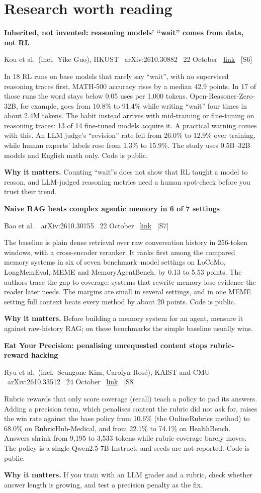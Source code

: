 \documentclass[11pt,a4paper]{article}
\newcommand{\entry}[4]{%
  \par\Needspace{7\baselineskip}\vspace{0.7em}%
  {\sffamily\bfseries\color{brandink}#1}\par
  {\footnotesize\color{brandgrey}#2 \textbullet\ \href{#3}{link} \textbullet\ \srcref{#4}}\par
  \vspace{0.15em}}
\newcommand{\why}[1]{\par{\small\textbf{Why it matters.} #1}\par}
\newcommand{\srcref}[1]{\textcolor{brandaccent}{[S#1]}}
\begin{document}
\section{Research worth reading}

\entry{Inherited, not invented: reasoning models' ``wait'' comes from data, not RL}{Kou et al.\ (incl.\ Yike Guo), HKUST \textbullet\ arXiv:2610.30882 \textbullet\ 22 October}{https://arxiv.org/abs/2610.30882}{6}
In 18 RL runs on base models that rarely say ``wait'', with no supervised reasoning traces first, MATH-500 accuracy rises by a median 42.9 points. In 17 of those runs the word stays below 0.05 uses per
1,000 tokens. Open-Reasoner-Zero-32B, for example, goes from 10.8\% to 91.4\% while writing ``wait'' four times in about 2.4M tokens. The habit instead arrives with
mid-training or fine-tuning on reasoning traces: 13 of 14 fine-tuned models acquire it. A practical warning comes with this. An LLM judge's ``revision'' rate
fell from 26.0\% to 12.9\% over training, while human experts' labels rose from 1.3\% to 15.9\%. The study uses 0.5B--32B models and English math only. Code is public.
\why{Counting ``wait''s does not show that RL taught a model to reason, and LLM-judged reasoning metrics need a human spot-check before you trust their trend.}

\entry{Naive RAG beats complex agentic memory in 6 of 7 settings}{Bao et al.\ \textbullet\ arXiv:2610.30755 \textbullet\ 22 October}{https://arxiv.org/abs/2610.30755}{7}
The baseline is plain dense retrieval over raw conversation history in 256-token windows, with a cross-encoder reranker. It ranks first among the compared memory
systems in six of seven benchmark--model settings on LoCoMo, LongMemEval, MEME and MemoryAgentBench, by 0.13 to 5.53 points. The authors trace the
gap to coverage: systems that rewrite memory lose evidence the reader later needs. The margins are small in several settings, and in one MEME setting full context beats every method by about 20 points. Code is public.
\why{Before building a memory system for an agent, measure it against raw-history RAG; on these benchmarks the simple baseline usually wins.}

\entry{Eat Your Precision: penalising unrequested content stops rubric-reward hacking}{Ryu et al.\ (incl.\ Seungone Kim, Carolyn Ros\'e), KAIST and CMU \textbullet\ arXiv:2610.33512 \textbullet\ 24 October}{https://arxiv.org/abs/2610.33512}{8}
Rubric rewards that only score coverage (recall) teach a policy to pad its answers. Adding a precision term, which penalises content the rubric did not ask for, raises the win rate against the base policy
from 10.6\% (the OnlineRubrics method) to 68.0\% on RubricHub-Medical, and from 22.1\% to 74.1\% on HealthBench. Answers shrink from 9,195 to 3,533 tokens while rubric coverage barely moves.
The policy is a single Qwen2.5-7B-Instruct, and seeds are not reported. Code is public.
\why{If you train with an LLM grader and a rubric, check whether answer length is growing, and test a precision penalty as the fix.}
\end{document}
